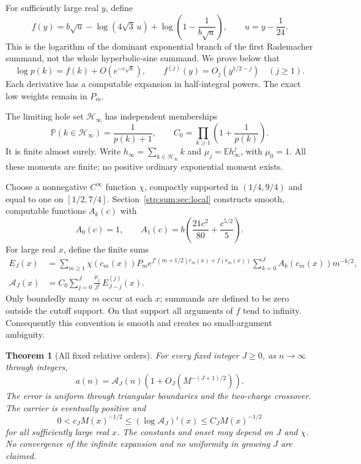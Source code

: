 \documentclass[11pt]{article}
\newtheorem{theorem}{Theorem}[section]
\theoremstyle{remark}\newtheorem{remark}[theorem]{Remark}
\newcommand{\E}{\mathbb E}
\newcommand{\Prob}{\mathbb P}
\newcommand{\cA}{\mathcal A}
\newcommand{\cH}{\mathcal H}
\begin{document}
For sufficiently large real $y$, define
\begin{equation}\label{stp:sum:eq:f}
 f(y)=b\sqrt{u}-\log(4\sqrt3\,u)
       +\log\left(1-\frac1{b\sqrt u}\right),\qquad u=y-\frac1{24}.
\end{equation}
This is the logarithm of the dominant exponential branch of the first Rademacher summand, not the whole hyperbolic-sine summand. We prove below that
\begin{equation}\label{stp:sum:eq:ferror}
 \log p(k)=f(k)+O(e^{-c\sqrt k}),\qquad
 f^{(j)}(y)=O_j(y^{1/2-j})\quad(j\ge1).
\end{equation}
Each derivative has a computable expansion in half-integral powers. The exact low weights remain in $P_m$.

The limiting hole set $\cH_\infty$ has independent memberships
\begin{equation}\label{stp:sum:eq:holelaw}
 \Prob(k\in\cH_\infty)=\frac1{p(k)+1},\qquad
 C_0=\prod_{k\ge1}\left(1+\frac1{p(k)}\right).
\end{equation}
It is finite almost surely. Write $h_\infty=\sum_{k\in\cH_\infty}k$ and $\mu_j=\E h_\infty^j$, with $\mu_0=1$. All these moments are finite; no positive ordinary exponential moment exists.

Choose a nonnegative $C^\infty$ function $\chi$, compactly supported in $(1/4,9/4)$ and equal to one on $[1/2,7/4]$. Section~\ref{stp:sum:sec:local} constructs smooth, computable functions $A_k(c)$ with
\begin{equation}\label{stp:sum:eq:Aone}
 A_0(c)=1,\qquad A_1(c)=b\left(\frac{21c^2}{80}+\frac{c^{5/2}}5\right).
\end{equation}
For large real $x$, define the finite sums
\begin{align}
 E_J(x)&=\sum_{m\ge1}\chi(c_m(x))P_m
  e^{f'(m+1/2)r_m(x)+f(r_m(x))}
  \sum_{k=0}^J A_k(c_m(x))m^{-k/2},\label{stp:sum:eq:EJ}\\
 \cA_J(x)&=C_0\sum_{j=0}^J\frac{\mu_j}{j!}\,E_{J-j}^{(j)}(x).
 \label{stp:sum:eq:carrier}
\end{align}
Only boundedly many $m$ occur at each $x$; summands are defined to be zero outside the cutoff support. On that support all arguments of $f$ tend to infinity. Consequently this convention is smooth and creates no small-argument ambiguity.

\begin{theorem}[All fixed relative orders]\label{stp:sum:thm:main}
For every fixed integer $J\ge0$, as $n\to\infty$ through integers,
\begin{equation}\label{stp:sum:eq:main}
 a(n)=\cA_J(n)\left(1+O_J(M^{-(J+1)/2})\right).
\end{equation}
The error is uniform through triangular boundaries and the two-charge crossover. The carrier is eventually positive and
\begin{equation}\label{stp:sum:eq:slope}
 0<c_J M(x)^{-1/2}\le (\log\cA_J)'(x)
 \le C_J M(x)^{-1/2}
\end{equation}
for all sufficiently large real $x$. The constants and onset may depend on $J$ and $\chi$. No convergence of the infinite expansion and no uniformity in growing $J$ are claimed.
\end{theorem}
\end{document}

